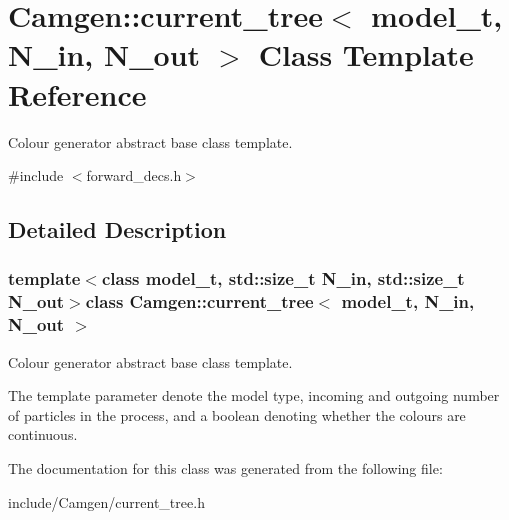 \hypertarget{a00113}{\section{Camgen\-:\-:current\-\_\-tree$<$ model\-\_\-t, N\-\_\-in, N\-\_\-out $>$ Class Template Reference}
\label{a00113}
}


Colour generator abstract base class template.  




{\ttfamily \#include $<$forward\-\_\-decs.\-h$>$}



\subsection{Detailed Description}
\subsubsection*{template$<$class model\-\_\-t, std\-::size\-\_\-t N\-\_\-in, std\-::size\-\_\-t N\-\_\-out$>$class Camgen\-::current\-\_\-tree$<$ model\-\_\-t, N\-\_\-in, N\-\_\-out $>$}

Colour generator abstract base class template. 

The template parameter denote the model type, incoming and outgoing number of particles in the process, and a boolean denoting whether the colours are continuous. 

The documentation for this class was generated from the following file\-:\begin{DoxyCompactItemize}
\item 
include/\-Camgen/current\-\_\-tree.\-h\end{DoxyCompactItemize}

